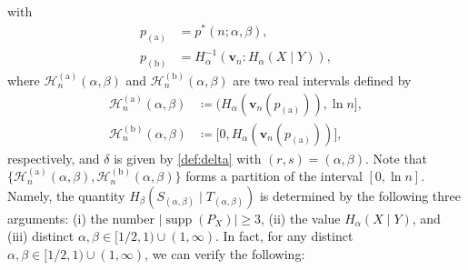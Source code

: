\documentclass[conference, draftcls, onecolumn]{IEEEtran}
\theoremstyle{plain}
\newcommand{\bvec}[1]{\boldsymbol{#1}}
\newcommand{\supp}{\operatorname{supp}}
\begin{document}
with
\begin{align}
p_{(\mathrm{a})}
& =
p^{\ast}(n; \alpha, \beta) ,
\label{eq:p_a_renyi} \\
p_{(\mathrm{b})}
& =
H_{\alpha}^{-1}( \bvec{v}_{n} : H_{\alpha}(X \mid Y) ) ,
\label{eq:p_b_renyi} 
\end{align}
where $\mathcal{H}_{n}^{(\mathrm{a})}( \alpha, \beta )$ and $\mathcal{H}_{n}^{(\mathrm{b})}( \alpha, \beta )$ are two real intervals defined by
\begin{align}
\mathcal{H}_{n}^{(\mathrm{a})}( \alpha, \beta )
& \coloneqq
\big( H_{\alpha}( \bvec{v}_{n}( p_{(\mathrm{a})} ) ), \ln n \big] ,
\label{def:interval_Ha} \\
\mathcal{H}_{n}^{(\mathrm{b})}( \alpha, \beta )
& \coloneqq
\big[ 0, H_{\alpha}( \bvec{v}_{n}( p_{(\mathrm{a})} ) ) \big] ,
\label{def:interval_Hb}
\end{align}
respectively, and $\delta$ is given by \eqref{def:delta} with $(r, s) = (\alpha, \beta)$.
Note that $\{ \mathcal{H}_{n}^{(\mathrm{a})}( \alpha, \beta ), \mathcal{H}_{n}^{(\mathrm{b})}( \alpha, \beta ) \}$ forms a partition of the interval $[0, \ln n]$.
Namely, the quantity $H_{\beta}(S_{(\alpha, \beta)} \mid T_{(\alpha, \beta)})$ is determined by the following three arguments: (i) the number $|\!\supp( P_{X} )| \ge 3$, (ii) the value $H_{\alpha}(X \mid Y)$, and (iii) distinct $\alpha, \beta \in [1/2, 1) \cup (1, \infty)$. 
In fact, for any distinct $\alpha, \beta \in [1/2, 1) \cup (1, \infty)$, we can verify the following:
\end{document}
